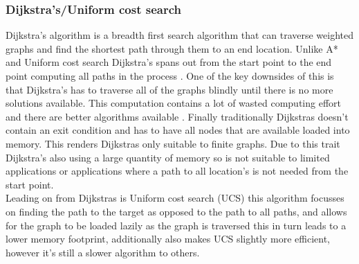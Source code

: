 \subsubsection{Dijkstra's/Uniform cost search}
Dijkstra’s algorithm is a breadth first search algorithm that can traverse weighted graphs and find the shortest path through them to an end location. Unlike A* and Uniform cost search Dijkstra’s spans out from the start point to the end point computing all paths in the process \cite{felner_2011_position}. One of the key downsides of this is that Dijkstra’s has to traverse all of the graphs blindly until there is no more solutions available. This computation contains a lot of wasted computing effort and there are better algorithms available \cite{felner_2011_position}. Finally traditionally Dijkstras doesn't contain an exit condition and has to have all nodes that are available loaded into memory. This renders Dijkstras only suitable to finite graphs. Due to this trait Dijkstra's also using a large quantity of memory so is not suitable to limited applications or applications where a path to all location's is not needed from the start point.\\
Leading on from Dijkstras is Uniform cost search (UCS) this algorithm focusses on finding the path to the target as opposed to the path to all paths, and allows for the graph to be loaded lazily as the graph is traversed this in turn leads to a lower memory footprint, additionally also makes UCS slightly more efficient, however it's still a slower algorithm to others.